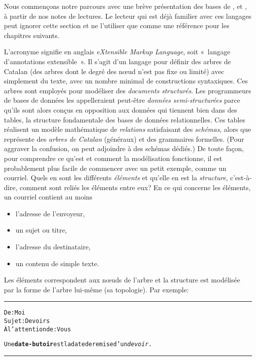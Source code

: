 Nous commençons notre parcours avec une brève présentation des bases
de \XML, \HTML et \DTD, à partir de nos notes de lectures. Le lecteur
qui est déjà familier avec ces langages peut ignorer cette section et
ne l'utiliser que comme une référence pour les chapitres suivants.

\mypar{\XML}

L'acronyme \XML signifie en anglais \emph{eXtensible Markup Language},
soit «~langage d'annotations extensible~». Il s'agit d'un langage pour
définir des arbres de Catalan (des arbres dont le degré des n{\oe}ud
n'est pas fixe ou limité) avec simplement du texte, avec un nombre
minimal de constructions syntaxiques. Ces arbres sont employés pour
modéliser des \emph{documents structurés}. Les programmeurs de bases
de données les appelleraient peut-être \emph{données semi-structurées}
parce qu'ils sont alors conçus en opposition aux données qui tiennent
bien dans des tables, la structure fondamentale des bases de données
relationnelles. Ces tables réalisent un modèle mathématique de
\emph{relations} satisfaisant des \emph{schémas}, alors que \XML
représente des \emph{arbres de Catalan} (généraux) et des grammaires
formelles. (Pour aggraver la confusion, on peut adjoindre à \XML des
schémas dédiés.)  De toute façon, pour comprendre ce qu'est \XML et
comment la modélisation fonctionne, il est probablement plus facile de
commencer avec un petit exemple, comme un courriel. Quels en sont les
différents \emph{éléments} et qu'elle en est la \emph{structure},
c'est-à-dire, comment sont reliés les éléments entre eux? En ce qui
concerne les éléments, un courriel contient au moins
\begin{itemize}

  \item l'adresse de l'envoyeur,

  \item un sujet ou titre,

  \item l'adresse du destinataire,

  \item un contenu de simple texte.

\end{itemize}
Les éléments correspondent aux n{\oe}uds de l'arbre et la structure
est modélisée par la forme de l'arbre lui-même (sa topologie). Par
exemple:\\
\noindent\rule{\linewidth}{0.5pt}
\begin{alltt}
De: Moi
Sujet: Devoirs
À l'attention de: Vous

  Une \textbf{date-butoir} est la date de remise d'un \emph{devoir}.
\end{alltt}
\rule{\linewidth}{0.5pt}

